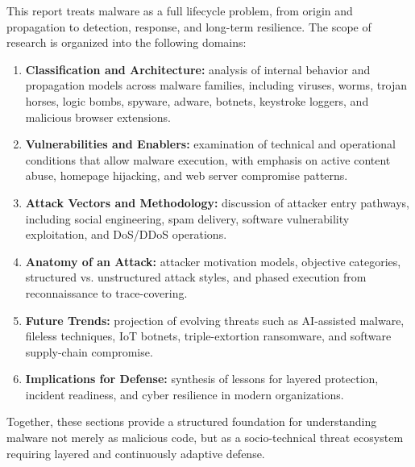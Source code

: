 This report treats malware as a full lifecycle problem, from origin and propagation to detection, response, and long-term resilience.
The scope of research is organized into the following domains:

\begin{enumerate}
	\item \textbf{Classification and Architecture:} analysis of internal behavior and propagation models across malware families, including viruses, worms, trojan horses, logic bombs, spyware, adware, botnets, keystroke loggers, and malicious browser extensions.
	\item \textbf{Vulnerabilities and Enablers:} examination of technical and operational conditions that allow malware execution, with emphasis on active content abuse, homepage hijacking, and web server compromise patterns.
	\item \textbf{Attack Vectors and Methodology:} discussion of attacker entry pathways, including social engineering, spam delivery, software vulnerability exploitation, and DoS/DDoS operations.
	\item \textbf{Anatomy of an Attack:} attacker motivation models, objective categories, structured vs. unstructured attack styles, and phased execution from reconnaissance to trace-covering.
	\item \textbf{Future Trends:} projection of evolving threats such as AI-assisted malware, fileless techniques, IoT botnets, triple-extortion ransomware, and software supply-chain compromise.
	\item \textbf{Implications for Defense:} synthesis of lessons for layered protection, incident readiness, and cyber resilience in modern organizations.
\end{enumerate}

Together, these sections provide a structured foundation for understanding malware not merely as malicious code, but as a socio-technical threat ecosystem requiring layered and continuously adaptive defense.